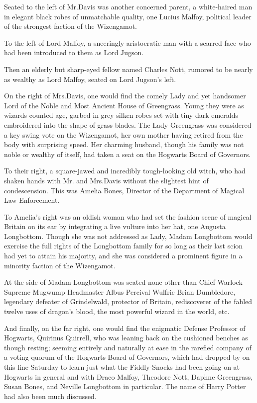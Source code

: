 Seated to the left of Mr.\?Davis was another concerned parent, a white-haired man in elegant black robes of unmatchable quality, one Lucius Malfoy, political leader of the strongest faction of the Wizengamot.

To the left of Lord Malfoy, a sneeringly aristocratic man with a scarred face who had been introduced to them as Lord Jugson.

Then an elderly but sharp-eyed fellow named Charles Nott, rumored to be nearly as wealthy as Lord Malfoy, seated on Lord Jugson's left.

On the right of Mrs.\?Davis, one would find the comely Lady and yet handsomer Lord of the Noble and Most Ancient House of Greengrass. Young they were as wizards counted age, garbed in grey silken robes set with tiny dark emeralds embroidered into the shape of grass blades. The Lady Greengrass was considered a key swing vote on the Wizengamot, her own mother having retired from the body with surprising speed. Her charming husband, though his family was not noble or wealthy of itself, had taken a seat on the Hogwarts Board of Governors.

To their right, a square-jawed and incredibly tough-looking old witch, who had shaken hands with Mr. and Mrs.\?Davis without the slightest hint of condescension. This was Amelia Bones, Director of the Department of Magical Law Enforcement.

To Amelia's right was an oldish woman who had set the fashion scene of magical Britain on its ear by integrating a live vulture into her hat, one Augusta Longbottom. Though she was not addressed as Lady, Madam Longbottom would exercise the full rights of the Longbottom family for so long as their last scion had yet to attain his majority, and she was considered a prominent figure in a minority faction of the Wizengamot.

At the side of Madam Longbottom was seated none other than Chief Warlock Supreme Mugwump Headmaster Albus Percival Wulfric Brian Dumbledore, legendary defeater of Grindelwald, protector of Britain, rediscoverer of the fabled twelve uses of dragon's blood, the most powerful wizard in the world, etc.

And finally, on the far right, one would find the enigmatic Defense Professor of Hogwarts, Quirinus Quirrell, who was leaning back on the cushioned benches as though resting; seeming entirely and naturally at ease in the rarefied company of a voting quorum of the Hogwarts Board of Governors, which had dropped by on this fine Saturday to learn just what the Fiddly-Snocks had been going on at Hogwarts in general and with Draco Malfoy, Theodore Nott, Daphne Greengrass, Susan Bones, and Neville Longbottom in particular. The name of Harry Potter had also been much discussed.

